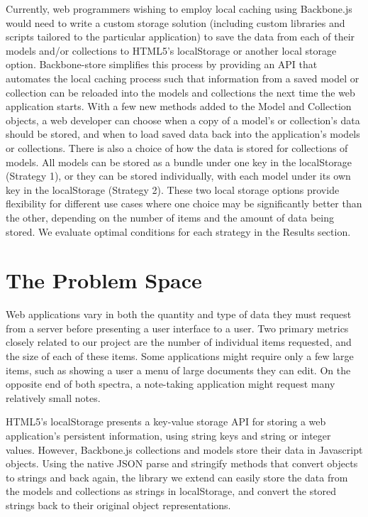 \documentclass[12pt]{article}
\begin{document}
Currently, web programmers wishing to employ local caching using Backbone.js would need to write a custom storage solution (including custom libraries and scripts tailored to the particular application) to save the data from each of their models and/or collections to HTML5's localStorage or another local storage option. Backbone-store simplifies this process by providing an API that automates the local caching process such that information from a saved model or collection can be reloaded into the
models and collections the next time the web application starts. With a few new
methods added to the Model and Collection objects, a web developer can choose
when a copy of a model's or collection's data should be stored, and when to
load saved data back into the application's models or collections. There is
also a choice of how the data is stored for collections of models. All models
can be stored as a bundle under one key in the localStorage (Strategy 1), or they can be
stored individually, with each model under its own key in the localStorage (Strategy 2).
These two local storage options provide flexibility for different use cases where one choice may be
significantly better than the other, depending on the number of items and
the amount of data being stored. We evaluate optimal conditions for each strategy in the Results section.

\section{The Problem Space}

Web applications vary in both the quantity and type of data they must request from a
server before presenting a user interface to a user. Two primary metrics
closely related to our project are the number of individual items requested,
and the size of each of these items. Some applications might require only a few
large items, such as showing a user a menu of large documents they can edit. On
the opposite end of both spectra, a note-taking application might request many
relatively small notes.

HTML5's localStorage presents a key-value storage API for storing a web
application's persistent information, using string keys and string or integer
values. However, Backbone.js collections and models store their data in
Javascript objects. Using the native JSON parse and stringify methods that
convert objects to strings and back again, the library we extend can easily
store the data from the models and collections as strings in localStorage, and
convert the stored strings back to their original object representations.
\end{document}
